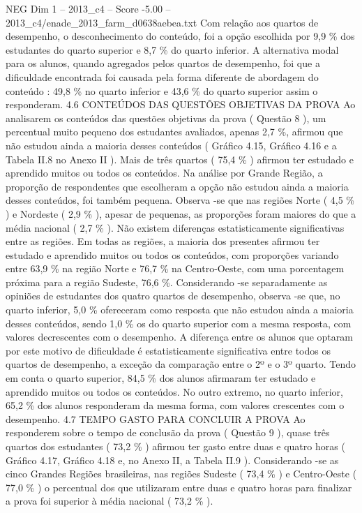 \begin{textsample}{NEG Dim 1 – 2013\_c4 – Score -5.00 – 2013\_c4/enade\_2013\_farm\_d0638aebea.txt}
Com relação aos quartos de desempenho, o desconhecimento do conteúdo, foi a opção escolhida por 9,9 \% dos estudantes do quarto superior e 8,7 \% do quarto inferior.
A alternativa modal para os alunos, quando agregados pelos quartos de desempenho, foi que a dificuldade encontrada foi causada pela forma diferente de abordagem do conteúdo : 49,8 \% no quarto inferior e 43,6 \% do quarto superior assim o responderam. 4.6 CONTEÚDOS DAS QUESTÕES OBJETIVAS DA PROVA Ao analisarem os conteúdos das questões objetivas da prova ( Questão 8 ), um percentual muito pequeno dos estudantes avaliados, apenas 2,7 \%, afirmou que não estudou ainda a maioria desses conteúdos ( Gráfico 4.15, Gráfico 4.16 e a Tabela II.8 no Anexo II ).
Mais de três quartos ( 75,4 \% ) afirmou ter estudado e aprendido muitos ou todos os conteúdos.
Na análise por Grande Região, a proporção de respondentes que escolheram a opção não estudou ainda a maioria desses conteúdos, foi também pequena.
Observa -se que nas regiões Norte ( 4,5 \% ) e Nordeste ( 2,9 \% ), apesar de pequenas, as proporções foram maiores do que a média nacional ( 2,7 \% ).
Não existem diferenças estatisticamente significativas entre as regiões.
Em todas as regiões, a maioria dos presentes afirmou ter estudado e aprendido muitos ou todos os conteúdos, com proporções variando entre 63,9 \% na região Norte e 76,7 \% na Centro-Oeste, com uma porcentagem próxima para a região Sudeste, 76,6 \%.
Considerando -se separadamente as opiniões de estudantes dos quatro quartos de desempenho, observa -se que, no quarto inferior, 5,0 \% ofereceram como resposta que não estudou ainda a maioria desses conteúdos, sendo 1,0 \% os do quarto superior com a mesma resposta, com valores decrescentes com o desempenho.
A diferença entre os alunos que optaram por este motivo de dificuldade é estatisticamente significativa entre todos os quartos de desempenho, a exceção da comparação entre o 2º e o 3º quarto.
Tendo em conta o quarto superior, 84,5 \% dos alunos afirmaram ter estudado e aprendido muitos ou todos os conteúdos.
No outro extremo, no quarto inferior, 65,2 \% dos alunos responderam da mesma forma, com valores crescentes com o desempenho. 4.7 TEMPO GASTO PARA CONCLUIR A PROVA Ao responderem sobre o tempo de conclusão da prova ( Questão 9 ), quase três quartos dos estudantes ( 73,2 \% ) afirmou ter gasto entre duas e quatro horas ( Gráfico 4.17, Gráfico 4.18 e, no Anexo II, a Tabela II.9 ).
Considerando -se as cinco Grandes Regiões brasileiras, nas regiões Sudeste ( 73,4 \% ) e Centro-Oeste ( 77,0 \% ) o percentual dos que utilizaram entre duas e quatro horas para finalizar a prova foi superior à média nacional ( 73,2 \% ).

\end{textsample}
